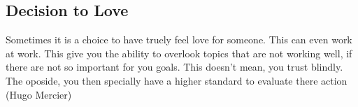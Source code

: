 \subsection{Decision to Love}
Sometimes it is a choice to have truely feel love  for someone. This can even work at work. This give you the ability to overlook topics that are not working well, if there are not so important for you goals. This doesn't mean, you trust blindly. The oposide, you then specially have a higher standard to evaluate there action (Hugo Mercier) 
